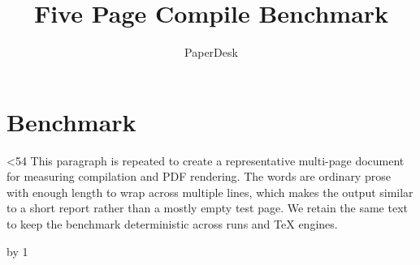 \documentclass[11pt,a4paper]{article}
\title{Five Page Compile Benchmark}
\author{PaperDesk}
\date{}
\begin{document}
\maketitle
\section{Benchmark}
\loop\ifnum\paragraphnumber<54
This paragraph is repeated to create a representative multi-page document for measuring compilation and PDF rendering. The words are ordinary prose with enough length to wrap across multiple lines, which makes the output similar to a short report rather than a mostly empty test page. We retain the same text to keep the benchmark deterministic across runs and TeX engines.
\par\medskip
\advance\paragraphnumber by 1
\repeat
\end{document}
